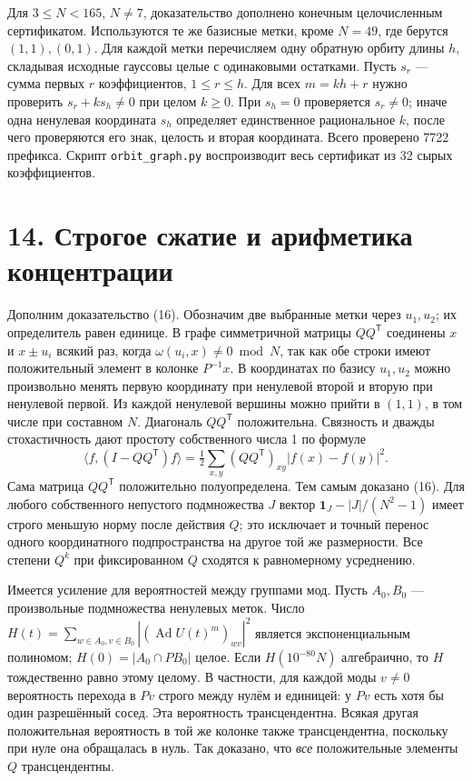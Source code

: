 \documentclass[11pt,a4paper]{article}
\newcommand{\sect}[1]{\section*{\sffamily\color{ink}#1}}
\begin{document}
Для $3\le N<165$, $N\ne7$, доказательство дополнено конечным целочисленным сертификатом. Используются те же базисные метки, кроме $N=49$, где берутся $(1,1),(0,1)$. Для каждой метки перечисляем одну обратную орбиту длины $h$, складывая исходные гауссовы целые с одинаковыми остатками. Пусть $s_r$ --- сумма первых $r$ коэффициентов, $1\le r\le h$. Для всех $m=kh+r$ нужно проверить $s_r+ks_h\ne0$ при целом $k\ge0$. При $s_h=0$ проверяется $s_r\ne0$; иначе одна ненулевая координата $s_h$ определяет единственное рациональное $k$, после чего проверяются его знак, целость и вторая координата. Всего проверено 7722 префикса. Скрипт \texttt{orbit\_graph.py} воспроизводит весь сертификат из 32 сырых коэффициентов.
\newpage
\sect{14. Строгое сжатие и арифметика концентрации}
Дополним доказательство (16). Обозначим две выбранные метки через $u_1,u_2$; их определитель равен единице. В графе симметричной матрицы $Q Q^{\mathsf T}$ соединены $x$ и $x\pm u_i$ всякий раз, когда $\omega(u_i,x)\ne0\bmod N$, так как обе строки имеют положительный элемент в колонке $P^{-1}x$. В координатах по базису $u_1,u_2$ можно произвольно менять первую координату при ненулевой второй и вторую при ненулевой первой. Из каждой ненулевой вершины можно прийти в $(1,1)$, в том числе при составном $N$. Диагональ $Q Q^{\mathsf T}$ положительна. Связность и дважды стохастичность дают простоту собственного числа 1 по формуле
\[
 \langle f,(I-QQ^{\mathsf T})f\rangle
 =\tfrac12\sum_{x,y}(QQ^{\mathsf T})_{xy}|f(x)-f(y)|^2 .
\]
Сама матрица $QQ^{\mathsf T}$ положительно полуопределена. Тем самым доказано (16). Для любого собственного непустого подмножества $J$ вектор $\mathbf1_J-|J|/(N^2-1)$ имеет строго меньшую норму после действия $Q$; это исключает и точный перенос одного координатного подпространства на другое той же размерности. Все степени $Q^k$ при фиксированном $Q$ сходятся к равномерному усреднению.

Имеется усиление для вероятностей между группами мод. Пусть $A_0,B_0$ --- произвольные подмножества ненулевых меток. Число $H(t)=\sum_{w\in A_0,v\in B_0}|(\operatorname{Ad} U(t)^m)_{wv}|^2$ является экспоненциальным полиномом; $H(0)=|A_0\cap P B_0|$ целое. Если $H(10^{-80}N)$ алгебраично, то $H$ тождественно равно этому целому. В частности, для каждой моды $v\ne0$ вероятность перехода в $Pv$ строго между нулём и единицей: у $Pv$ есть хотя бы один разрешённый сосед. Эта вероятность трансцендентна. Всякая другая положительная вероятность в той же колонке также трансцендентна, поскольку при нуле она обращалась в нуль. Так доказано, что \emph{все} положительные элементы $Q$ трансцендентны.
\end{document}
